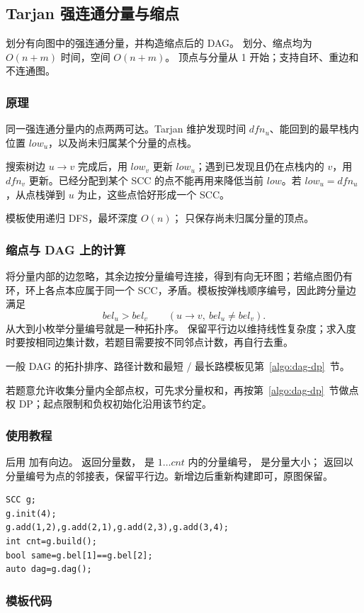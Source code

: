 \subsection{Tarjan 强连通分量与缩点}
\label{algo:scc}
\AlgorithmInfo
    {划分有向图中的强连通分量，并构造缩点后的 DAG。}
    {划分、缩点均为 $O(n+m)$ 时间，空间 $O(n+m)$。}
    {顶点与分量从 1 开始；支持自环、重边和不连通图。}

\subsubsection*{原理}
同一强连通分量内的点两两可达。Tarjan 维护发现时间 $dfn_u$、能回到的最早栈内位置 $low_u$，以及尚未归属某个分量的点栈。

搜索树边 $u\to v$ 完成后，用 $low_v$ 更新 $low_u$；遇到已发现且仍在点栈内的 $v$，用 $dfn_v$ 更新。已经分配到某个 SCC 的点不能再用来降低当前 $low$。若 $low_u=dfn_u$，从点栈弹到 $u$ 为止，这些点恰好形成一个 SCC。

模板使用递归 DFS，最坏深度 $O(n)$； 只保存尚未归属分量的顶点。

\subsubsection*{缩点与 DAG 上的计算}
将分量内部的边忽略，其余边按分量编号连接，得到有向无环图；若缩点图仍有环，环上各点本应属于同一个 SCC，矛盾。模板按弹栈顺序编号，因此跨分量边满足
\[
    bel_u>bel_v\qquad(u\to v,\ bel_u\ne bel_v).
\]
从大到小枚举分量编号就是一种拓扑序。 保留平行边以维持线性复杂度；求入度时要按相同边集计数，若题目需要按不同邻点计数，再自行去重。

一般 DAG 的拓扑排序、路径计数和最短 / 最长路模板见第~\ref{algo:dag-dp}~节。

若题意允许收集分量内全部点权，可先求分量权和，再按第~\ref{algo:dag-dp}~节做点权 DP；起点限制和负权初始化沿用该节约定。

\subsubsection*{使用教程}
 后用  加有向边。 返回分量数， 是 $1\ldots cnt$ 内的分量编号， 是分量大小； 返回以分量编号为点的邻接表，保留平行边。新增边后重新构建即可，原图保留。
\begin{lstlisting}[style=mtycpp,numbers=none]
SCC g;
g.init(4);
g.add(1,2),g.add(2,1),g.add(2,3),g.add(3,4);
int cnt=g.build();
bool same=g.bel[1]==g.bel[2];
auto dag=g.dag();
\end{lstlisting}

\subsubsection*{模板代码}
